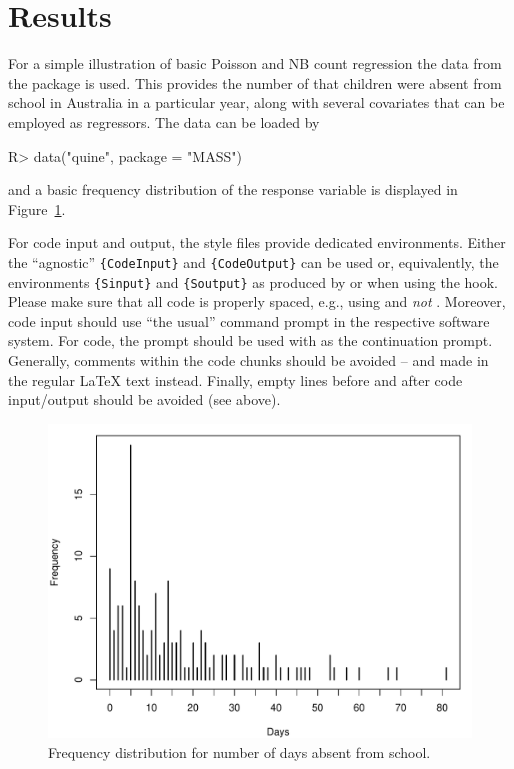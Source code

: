 \documentclass[article]{jss}
\newcommand{\fct}[1]{\code{#1()}}
\begin{document}
\section{Results} \label{sec:results}

For a simple illustration of basic Poisson and NB count regression the
 data from the  package is used. This provides the number
of  that children were absent from school in Australia in a
particular year, along with several covariates that can be employed as regressors.
The data can be loaded by
%
\begin{CodeChunk}
  \begin{CodeInput}
    R> data("quine", package = "MASS")
  \end{CodeInput}
\end{CodeChunk}
%
and a basic frequency distribution of the response variable is displayed in
Figure~\ref{fig:quine}.

\begin{leftbar}
  For code input and output, the style files provide dedicated environments.
  Either the ``agnostic'' \verb|{CodeInput}| and \verb|{CodeOutput}| can be used
  or, equivalently, the environments \verb|{Sinput}| and \verb|{Soutput}| as
  produced by \fct{Sweave} or  when using the 
  hook. Please make sure that all code is properly spaced, e.g., using
   and \emph{not} . Moreover, code input should
  use ``the usual'' command prompt in the respective software system. For
   code, the prompt  should be used with  as
  the continuation prompt. Generally, comments within the code chunks should be
  avoided -- and made in the regular {\LaTeX} text instead. Finally, empty lines
  before and after code input/output should be avoided (see above).
\end{leftbar}

\begin{figure}[t!]
  \centering
  \includegraphics{article-visualization}
  \caption{\label{fig:quine} Frequency distribution for number of days absent
    from school.}
\end{figure}
\end{document}
